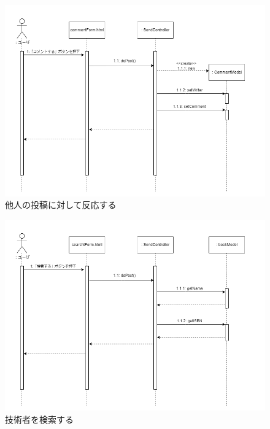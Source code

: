 \documentclass[dvipdfmx]{jsarticle}
\begin{document}
    \begin{figure}[H]
        \begin{center}
            \caption*{他人の投稿に対して反応する}
            \includegraphics[scale=0.6,clip]{pictures/sequence-graph/reaction.png}
        \end{center}
    \end{figure}

    \begin{figure}[H]
        \begin{center}
            \caption*{技術者を検索する}
            \includegraphics[scale=0.6,clip]{pictures/sequence-graph/searchBook.png}
        \end{center}
    \end{figure}
\end{document}
